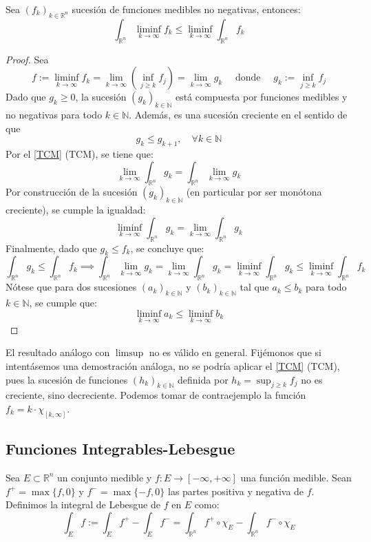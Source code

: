 \begin{lema} 
    Sea $(f_k)_{k\in\mathbb{R}^n}$ sucesión de funciones medibles no negativas, entonces: $$\int_{\mathbb{R}^n}\liminf_{k\to\infty}f_k \leq \liminf_{k\to\infty}\int_{\mathbb{R}^n}f_k$$
\end{lema}
\begin{proof}
    Sea $$ f := \liminf_{k \to \infty} f_k = \lim_{k \to \infty} \left(\inf_{j \geq k} f_j\right) = \lim_{k \to \infty} g_k \quad \text{ donde } \quad g_k := \inf_{j \geq k} f_j $$
    Dado que $ g_k \geq 0 $, la sucesión $ (g_k)_{k \in \mathbb{N}} $ está compuesta por funciones medibles y no negativas para todo $ k \in \mathbb{N} $. Además, es una sucesión creciente en el sentido de que
    $$ g_k \leq g_{k+1}, \quad \forall k \in \mathbb{N} $$ Por el \cref{TCM} (TCM), se tiene que:
    $$ \lim_{k \to \infty} \int_{\mathbb{R}^n} g_k = \int_{\mathbb{R}^n} \lim_{k \to \infty} g_k$$ Por construcción de la sucesión $ (g_k)_{k \in \mathbb{N}} $ (en particular por ser monótona creciente), se cumple la igualdad:
    $$\liminf_{k \to \infty} \int_{\mathbb{R}^n} g_k = \lim_{k \to \infty} \int_{\mathbb{R}^n} g_k$$
    Finalmente, dado que $ g_k \leq f_k $, se concluye que:
    $$\int_{\mathbb{R}^n} g_k \leq \int_{\mathbb{R}^n} f_k \implies \int_{\mathbb{R}^n} \lim_{k \to \infty} g_k = \lim_{k \to \infty} \int_{\mathbb{R}^n} g_k = \liminf_{k \to \infty} \int_{\mathbb{R}^n} g_k \leq \liminf_{k \to \infty} \int_{\mathbb{R}^n} f_k$$
    Nótese que para dos sucesiones $ (a_k)_{k \in \mathbb{N}} $ y $ (b_k)_{k \in \mathbb{N}} $ tal que $ a_k \leq b_k $ para todo $ k \in \mathbb{N} $, se cumple que:
    $$ \liminf_{k \to \infty} a_k \leq \liminf_{k \to \infty} b_k $$
\end{proof}
\begin{observación}
El resultado análogo con $\limsup$ no es válido en general. Fijémonos que si intentásemos una demostración análoga, no se podría aplicar el \cref{TCM} (TCM), pues la sucesión de funciones $ (h_k)_{k \in \mathbb{N}} $ definida por $ h_k = \sup_{j \geq k} f_j $ no es creciente, sino decreciente. Podemos tomar de contraejemplo la función $f_k = k \cdot \chi_{[k, \infty]}$.
\end{observación}

\subsection{Funciones Integrables-Lebesgue}

\begin{definición} 
    Sea $E \subset \mathbb{R}^n$ un conjunto medible y $f: E \to [-\infty, +\infty]$ una función medible. Sean $f^+ = \max\{f, 0\}$ y $f^- = \max\{-f, 0\}$ las partes positiva y negativa de $f$. Definimos la integral de Lebesgue de $f$ en $E$ como:
    \[
        \int_E f := \int_E f^+ - \int_E f^- = \int_{\mathbb{R}^n} f^+ \circ \chi_E - \int_{\mathbb{R}^n} f^- \circ \chi_E
    \]
\end{definición}

